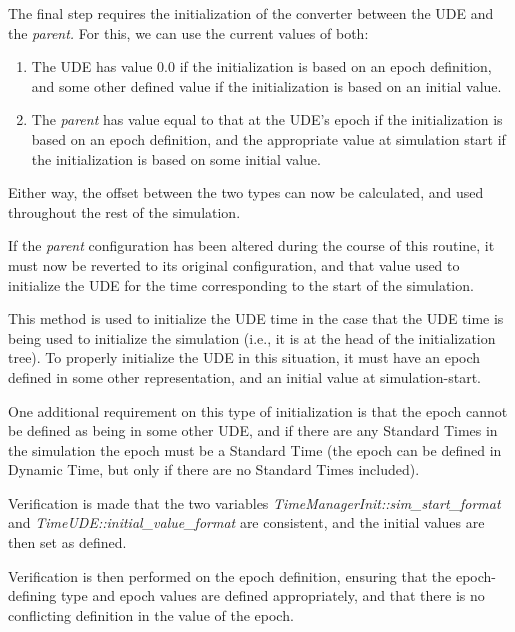 {\begin{enumerate}
{\begin{enumerate}
The final step requires the initialization of the converter between the
UDE and the \textit{parent.  }For this, we can use the current values
of both:


\begin{enumerate}
\item The UDE has value 0.0 if the initialization is based on an epoch
definition, and some other defined value if the initialization is based on an
initial value.
\item The \textit{parent} has value equal to that at the
UDE's epoch if the initialization is based on an epoch
definition, and the appropriate value at simulation start if the
initialization is based on some initial value.
\end{enumerate}
Either way, the offset between the two types can now be calculated, and
used throughout the rest of the simulation.




If the \textit{parent }configuration has been altered during the course
of this routine, it must now be reverted to its original configuration,
and that value used to initialize the UDE for the time corresponding to
the start of the simulation.

This method is used to initialize the UDE time in the case that the UDE
time is being used to initialize the simulation (i.e., it is at the head
of the initialization tree).  To properly initialize the UDE in this
situation, it must have an epoch defined in some other representation,
and an initial value at simulation-start.

One additional requirement
on this type of initialization is that the epoch cannot be defined as
being in some other UDE, and if there are any
Standard Times in the simulation the epoch must be a Standard Time (the epoch
can be defined in Dynamic
Time, but only if there are no Standard Times included).

Verification is made that the two variables
\textit{TimeManagerInit::sim\_start\_format } and
\textit{TimeUDE::initial\_value\_format} are consistent, and the
initial values are then set as defined.

Verification is then performed on the epoch definition, ensuring that
the epoch-defining type and epoch values are defined appropriately, and
that there is no conflicting definition in the value of the epoch.


\end{enumerate}}
\end{enumerate}}
